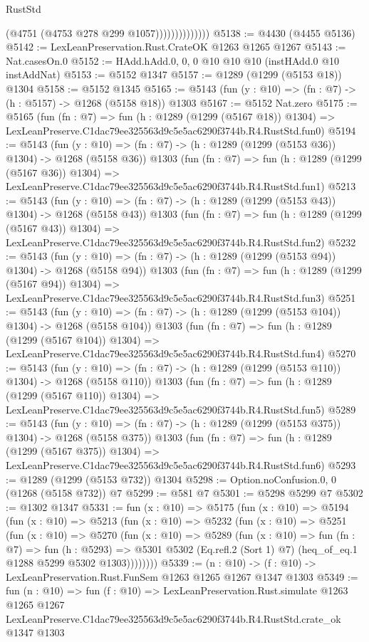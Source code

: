 \begin{lexlean}{RustStd}
\begin{coremodule}
                            (@4751 (@4753 @278 @299 @1057))))))))))))))
@5138 := @4430 (@4455 @5136)
@5142 := LexLeanPreservation.Rust.CrateOK @1263 @1265 @1267
@5143 := Nat.casesOn.{0}
@5152 := HAdd.hAdd.{0, 0, 0} @10 @10 @10 (instHAdd.{0} @10 instAddNat)
@5153 := @5152 @1347
@5157 := @1289 (@1299 (@5153 @18)) @1304
@5158 := @5152 @1345
@5165 := @5143 (fun (y : @10) => (fn : @7) -> (h : @5157) -> @1268 (@5158 @18)) @1303
@5167 := @5152 Nat.zero
@5175 := @5165
    (fun (fn : @7) =>
    fun (h : @1289 (@1299 (@5167 @18)) @1304) =>
    LexLeanPreserve.C1dac79ee325563d9c5e5ac6290f3744b.R4.RustStd.fun0)
@5194 := @5143
    (fun (y : @10) => (fn : @7) -> (h : @1289 (@1299 (@5153 @36)) @1304) -> @1268 (@5158 @36))
    @1303
    (fun (fn : @7) =>
    fun (h : @1289 (@1299 (@5167 @36)) @1304) =>
    LexLeanPreserve.C1dac79ee325563d9c5e5ac6290f3744b.R4.RustStd.fun1)
@5213 := @5143
    (fun (y : @10) => (fn : @7) -> (h : @1289 (@1299 (@5153 @43)) @1304) -> @1268 (@5158 @43))
    @1303
    (fun (fn : @7) =>
    fun (h : @1289 (@1299 (@5167 @43)) @1304) =>
    LexLeanPreserve.C1dac79ee325563d9c5e5ac6290f3744b.R4.RustStd.fun2)
@5232 := @5143
    (fun (y : @10) => (fn : @7) -> (h : @1289 (@1299 (@5153 @94)) @1304) -> @1268 (@5158 @94))
    @1303
    (fun (fn : @7) =>
    fun (h : @1289 (@1299 (@5167 @94)) @1304) =>
    LexLeanPreserve.C1dac79ee325563d9c5e5ac6290f3744b.R4.RustStd.fun3)
@5251 := @5143
    (fun (y : @10) => (fn : @7) -> (h : @1289 (@1299 (@5153 @104)) @1304) -> @1268 (@5158 @104))
    @1303
    (fun (fn : @7) =>
    fun (h : @1289 (@1299 (@5167 @104)) @1304) =>
    LexLeanPreserve.C1dac79ee325563d9c5e5ac6290f3744b.R4.RustStd.fun4)
@5270 := @5143
    (fun (y : @10) => (fn : @7) -> (h : @1289 (@1299 (@5153 @110)) @1304) -> @1268 (@5158 @110))
    @1303
    (fun (fn : @7) =>
    fun (h : @1289 (@1299 (@5167 @110)) @1304) =>
    LexLeanPreserve.C1dac79ee325563d9c5e5ac6290f3744b.R4.RustStd.fun5)
@5289 := @5143
    (fun (y : @10) => (fn : @7) -> (h : @1289 (@1299 (@5153 @375)) @1304) -> @1268 (@5158 @375))
    @1303
    (fun (fn : @7) =>
    fun (h : @1289 (@1299 (@5167 @375)) @1304) =>
    LexLeanPreserve.C1dac79ee325563d9c5e5ac6290f3744b.R4.RustStd.fun6)
@5293 := @1289 (@1299 (@5153 @732)) @1304
@5298 := Option.noConfusion.{0, 0} (@1268 (@5158 @732)) @7
@5299 := @581 @7
@5301 := @5298 @5299 @7
@5302 := @1302 @1347
@5331 := fun (x : @10) =>
  @5175
    (fun (x : @10) =>
    @5194
      (fun (x : @10) =>
      @5213
        (fun (x : @10) =>
        @5232
          (fun (x : @10) =>
          @5251
            (fun (x : @10) =>
            @5270
              (fun (x : @10) =>
              @5289
                (fun (x : @10) =>
                fun (fn : @7) =>
                fun (h : @5293) =>
                @5301 @5302 (Eq.refl.{2} (Sort 1) @7) (heq_of_eq.{1} @1288 @5299 @5302 @1303))))))))
@5339 := (n : @10) -> (f : @10) -> LexLeanPreservation.Rust.FunSem @1263 @1265 @1267 @1347 @1303
@5349 := fun (n : @10) =>
  fun (f : @10) =>
  LexLeanPreservation.Rust.simulate
    @1263
    @1265
    @1267
    LexLeanPreserve.C1dac79ee325563d9c5e5ac6290f3744b.R4.RustStd.crate_ok
    @1347
    @1303
\end{coremodule}
\end{lexlean}
